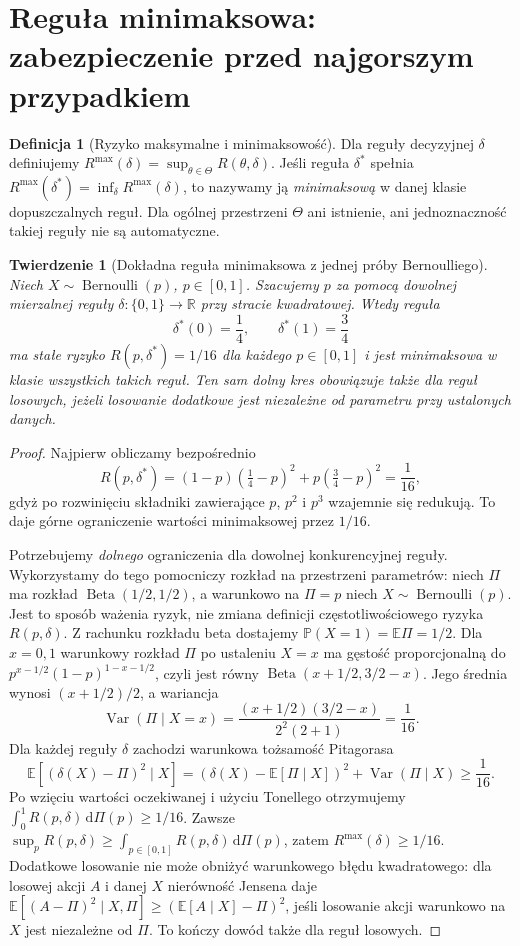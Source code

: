 \documentclass[11pt,a4paper,oneside]{report}
\numberwithin{equation}{chapter}
\theoremstyle{plain}
\newtheorem{twierdzenie}{Twierdzenie}[chapter]
\theoremstyle{definition}
\newtheorem{definicja}{Definicja}[chapter]
\theoremstyle{remark}
\newcommand{\R}{\mathbb R}
\newcommand{\Prob}{\mathbb P}
\newcommand{\E}{\mathbb E}
\newcommand{\Var}{\operatorname{Var}}
\newcommand{\dd}{\mathrm d}
\begin{document}
\section{Reguła minimaksowa: zabezpieczenie przed najgorszym przypadkiem}
\begin{definicja}[Ryzyko maksymalne i minimaksowość]\label{def:minimax}
Dla reguły decyzyjnej $\delta$ definiujemy
$R^{\max}(\delta)=\sup_{\theta\in\Theta}R(\theta,\delta)$.
Jeśli reguła $\delta^*$ spełnia
$R^{\max}(\delta^*)=\inf_\delta R^{\max}(\delta)$, to nazywamy ją
\emph{minimaksową} w danej klasie dopuszczalnych reguł.
Dla ogólnej przestrzeni $\Theta$ ani istnienie, ani jednoznaczność
takiej reguły nie są automatyczne.
\end{definicja}

\begin{twierdzenie}[Dokładna reguła minimaksowa z jednej próby Bernoulliego]
\label{thm:minimax-bernoulli-one}
Niech $X\sim\operatorname{Bernoulli}(p)$, $p\in[0,1]$.
Szacujemy $p$ za pomocą dowolnej mierzalnej reguły
$\delta:\{0,1\}\to\R$ przy stracie kwadratowej.
Wtedy reguła
\[
\delta^*(0)=\frac14,\qquad \delta^*(1)=\frac34
\]
ma stałe ryzyko $R(p,\delta^*)=1/16$ dla każdego $p\in[0,1]$
i jest minimaksowa w klasie wszystkich takich reguł.
Ten sam dolny kres obowiązuje także dla reguł losowych, jeżeli
losowanie dodatkowe jest niezależne od parametru przy ustalonych danych.
\end{twierdzenie}
\begin{proof}
Najpierw obliczamy bezpośrednio
\[
R(p,\delta^*)=(1-p)(\tfrac14-p)^2+p(\tfrac34-p)^2
=\frac1{16},
\]
gdyż po rozwinięciu składniki zawierające $p$, $p^2$ i $p^3$
wzajemnie się redukują. To daje górne ograniczenie wartości
minimaksowej przez $1/16$.

Potrzebujemy \emph{dolnego} ograniczenia dla dowolnej konkurencyjnej
reguły. Wykorzystamy do tego pomocniczy rozkład na przestrzeni
parametrów: niech $\Pi$ ma rozkład
$\operatorname{Beta}(1/2,1/2)$, a warunkowo na $\Pi=p$ niech
$X\sim\operatorname{Bernoulli}(p)$. Jest to sposób ważenia ryzyk,
nie zmiana definicji częstotliwościowego ryzyka $R(p,\delta)$.
Z rachunku rozkładu beta dostajemy $\Prob(X=1)=\E\Pi=1/2$.
Dla $x=0,1$ warunkowy rozkład $\Pi$ po ustaleniu $X=x$ ma gęstość
proporcjonalną do
$p^{x-1/2}(1-p)^{1-x-1/2}$, czyli jest równy
$\operatorname{Beta}(x+1/2,3/2-x)$.
Jego średnia wynosi $(x+1/2)/2$, a wariancja
\[
\Var(\Pi\mid X=x)
=\frac{(x+1/2)(3/2-x)}{2^2(2+1)}
=\frac1{16}.
\]
Dla każdej reguły $\delta$ zachodzi warunkowa tożsamość Pitagorasa
\[
\E[(\delta(X)-\Pi)^2\mid X]
=(\delta(X)-\E[\Pi\mid X])^2+\Var(\Pi\mid X)
\ge\frac1{16}.
\]
Po wzięciu wartości oczekiwanej i użyciu Tonellego otrzymujemy
$\int_0^1R(p,\delta)\,\dd\Pi(p)\ge1/16$.
Zawsze
$\sup_pR(p,\delta)\ge\int_{p\in[0,1]}R(p,\delta)\,\dd\Pi(p)$,
zatem $R^{\max}(\delta)\ge1/16$.
Dodatkowe losowanie nie może obniżyć warunkowego błędu kwadratowego:
dla losowej akcji $A$ i danej $X$ nierówność Jensena daje
$\E[(A-\Pi)^2\mid X,\Pi]\ge(\E[A\mid X]-\Pi)^2$,
jeśli losowanie akcji warunkowo na $X$ jest niezależne od $\Pi$.
To kończy dowód także dla reguł losowych.
\end{proof}
\end{document}
